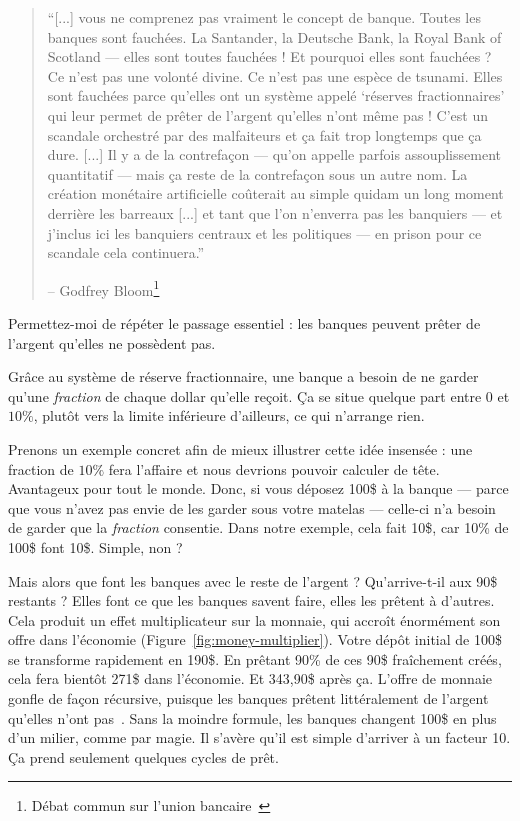 \begin{quotation}\begin{samepage}
\enquote{[...] vous ne comprenez pas vraiment le concept de banque. Toutes les
banques sont fauchées. La Santander, la Deutsche Bank, la Royal Bank of Scotland
--- elles sont toutes fauchées ! Et pourquoi elles sont fauchées ? Ce
n'est pas une volonté divine. Ce n'est pas une espèce de tsunami. Elles sont
fauchées parce qu'elles ont un système appelé `réserves fractionnaires' qui leur
permet de prêter de l'argent qu'elles n'ont même pas ! C'est un scandale
orchestré par des malfaiteurs et ça fait trop longtemps que ça dure. [...] Il y
a de la contrefaçon --- qu'on appelle parfois assouplissement quantitatif ---
mais ça reste de la contrefaçon sous un autre nom. La création monétaire
artificielle coûterait au simple quidam un long moment derrière les barreaux
[...] et tant que l'on n'enverra pas les banquiers --- et j'inclus ici les
banquiers centraux et les politiques --- en prison pour ce scandale cela
continuera.}
\begin{flushright} -- Godfrey Bloom\footnote{Débat commun sur l'union
bancaire~\cite{godfrey-bloom}}
\end{flushright}\end{samepage}\end{quotation}

Permettez-moi de répéter le passage essentiel : les banques peuvent prêter de
l'argent qu'elles ne possèdent pas.

Grâce au système de réserve fractionnaire, une banque a besoin de ne garder
qu'une \textit{fraction} de chaque dollar qu'elle reçoit. Ça se situe quelque
part entre $0$ et $10\%$, plutôt vers la limite inférieure d'ailleurs, ce qui
n'arrange rien.

Prenons un exemple concret afin de mieux illustrer cette idée insensée : une
fraction de $10\%$ fera l'affaire et nous devrions pouvoir calculer de tête. 
Avantageux pour tout le monde. Donc, si vous déposez 100\$ à la banque ---
parce que vous n'avez pas envie de les garder sous votre matelas --- celle-ci
n'a besoin de garder que la \textit{fraction} consentie. Dans notre exemple,
cela fait 10\$, car 10\% de 100\$ font 10\$. Simple, non ?

Mais alors que font les banques avec le reste de l'argent ? Qu'arrive-t-il aux
90\$ restants ? Elles font ce que les banques savent faire, elles les prêtent à
d'autres. Cela produit un effet multiplicateur sur la monnaie, qui accroît
énormément son offre dans l'économie (Figure~\ref{fig:money-multiplier}). Votre
dépôt initial de 100\$ se transforme rapidement en 190\$. En prêtant 90\% de ces
90\$ fraîchement créés, cela fera bientôt 271\$ dans l'économie. Et 343,90\$
après ça. L'offre de monnaie gonfle de façon récursive, puisque les banques
prêtent littéralement de l'argent qu'elles n'ont
pas~\cite{wiki:money-multiplier}. Sans la moindre formule, les banques changent
100\$ en plus d'un milier, comme par magie. Il s'avère qu'il est simple
d'arriver à un facteur 10. Ça prend seulement quelques cycles de prêt.

